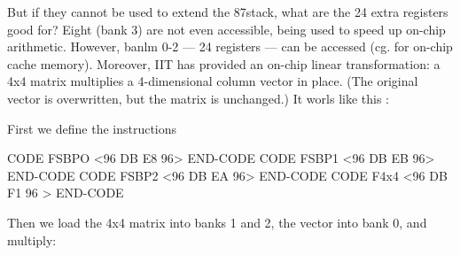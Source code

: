 But if they cannot be used to extend the 87stack, what are the 24
extra registers good for? Eight (bank 3) are not even accessible,
being used to speed up on-chip arithmetic. However, banlm 0-2
— 24 registers — can be accessed (cg. for on-chip cache memory).
Moreover, IIT has provided an on-chip linear transformation: a
4x4 matrix multiplies a 4-dimensional column vector in place. (The
original vector is overwritten, but the matrix is unchanged.) It worls
like this :

First we deﬁne the instructions

CODE FSBPO <96 DB E8 96> END-CODE
CODE FSBP1 <96 DB EB 96> END-CODE
CODE FSBP2 <96 DB EA 96> END-CODE
CODE F4x4 <96 DB F1 96 > END-CODE

Then we load the 4x4 matrix into banks 1 and 2, the vector into
bank 0, and multiply:

